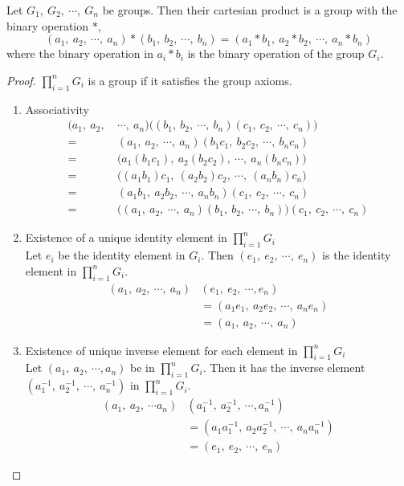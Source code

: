 \begin{theorem}
	Let $G_1,\ G_2,\ \cdots,\ G_n$ be groups.
	Then their cartesian product is a group with the binary operation $\ast$,
	$$ (a_1,\ a_2,\ \cdots,\ a_n) \ast (b_1,\ b_2,\ \cdots,\ b_n) = (a_1 \ast b_1,\ a_2 \ast b_2,\ \cdots,\ a_n \ast b_n) $$
	where the binary operation in  $a_i \ast b_i$ is the binary operation of the group $G_i$.
\end{theorem}
\begin{proof}
	$\prod\limits_{i = 1}^n G_i$ is a group if it satisfies the group axioms.
	\begin{enumerate}[label=G\arabic*]
		\item Associativity
			\begin{align*}
				(a_1,\ a_2,\ & \cdots,\ a_n) \big( (b_1,\ b_2,\ \cdots,\ b_n)(c_1,\ c_2,\ \cdots,\ c_n) \big) \\
				= & (a_1,\ a_2,\ \cdots,\ a_n)(b_1c_1,\ b_2c_2,\ \cdots,\ b_nc_n) \\
				= & \big( a_1(b_1c_1),\ a_2(b_2c_2),\ \cdots,\ a_n(b_nc_n) \big) \\
				= & \big( (a_1 b_1)c_1,\ (a_2b_2)c_2,\ \cdots,\ (a_nb_n )c_n \big) \\
				= &  (a_1b_1,\ a_2b_2,\ \cdots,\ a_nb_n)(c_1,\ c_2,\ \cdots,\ c_n) \\
				= & \big( (a_1,\ a_2,\ \cdots,\ a_n)(b_1,\ b_2,\ \cdots,\ b_n) \big)(c_1,\ c_2,\ \cdots,\ c_n)
			\end{align*}
		\item Existence of a unique identity element in $\prod\limits_{i = 1}^n G_i$\\
			Let $e_i$ be the identity element in $G_i$.
			Then $(e_1,\ e_2,\ \cdots,\ e_n)$ is the identity element in $\prod\limits_{i = 1}^n G_i$.
			\begin{align*}
				(a_1,\ a_2,\ \cdots,\ a_n)&(e_1,\ e_2,\ \cdots, e_n) \\
				& = (a_1e_1,\ a_2e_2,\ \cdots,\ a_ne_n) \\
				& = (a_1,\ a_2,\ \cdots,\ a_n)
			\end{align*}
		\item Existence of unique inverse element for each element in $\prod\limits_{i = 1}^n G_i$\\
			Let $(a_1,\ a_2,\ \cdots, a_n)$ be in $\prod\limits_{i = 1}^n G_i$.
			Then it has the inverse element $( a_1^{-1},\ a_2^{-1},\ \cdots,\ a_n^{-1} )$ in $\prod\limits_{i = 1}^n G_i$.
			\begin{align*}
				(a_1,\ a_2,\ \cdots a_n)&(a_1^{-1},\ a_2^{-1},\ \cdots, a_n^{-1}) \\
				& = (a_1a_1^{-1},\ a_2a_2^{-1},\ \cdots,\ a_na_n^{-1}) \\
				& = (e_1,\ e_2,\ \cdots,\ e_n)
			\end{align*}
	\end{enumerate}
\end{proof}

